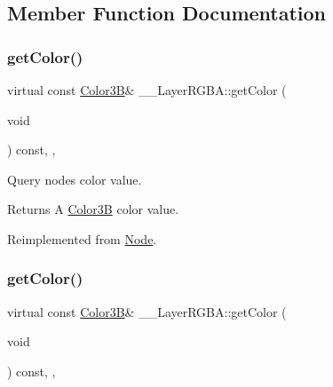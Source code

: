 \subsection{Member Function Documentation}
\mbox{\label{class____LayerRGBA_ab14530232cae13fbf4399e0a47daa315}} 
\subsubsection{\texorpdfstring{get\+Color()}{getColor()}\hspace{0.1cm}{\footnotesize\ttfamily [1/2]}}
{\footnotesize\ttfamily virtual const \hyperlink{structColor3B}{Color3B}\& \+\_\+\+\_\+\+Layer\+R\+G\+B\+A\+::get\+Color (\begin{DoxyParamCaption}\item[{void}]{ }\end{DoxyParamCaption}) const\hspace{0.3cm}{\ttfamily [inline]}, {\ttfamily [override]}, {\ttfamily [virtual]}}

Query node\textquotesingle{}s color value. \begin{DoxyReturn}{Returns}
A \hyperlink{structColor3B}{Color3B} color value. 
\end{DoxyReturn}


Reimplemented from \hyperlink{classNode_a06721d272f5a59e02e355d95be25bb99}{Node}.

\mbox{\label{class____LayerRGBA_ab14530232cae13fbf4399e0a47daa315}} 
\subsubsection{\texorpdfstring{get\+Color()}{getColor()}\hspace{0.1cm}{\footnotesize\ttfamily [2/2]}}
{\footnotesize\ttfamily virtual const \hyperlink{structColor3B}{Color3B}\& \+\_\+\+\_\+\+Layer\+R\+G\+B\+A\+::get\+Color (\begin{DoxyParamCaption}\item[{void}]{ }\end{DoxyParamCaption}) const\hspace{0.3cm}{\ttfamily [inline]}, {\ttfamily [override]}, {\ttfamily [virtual]}}


